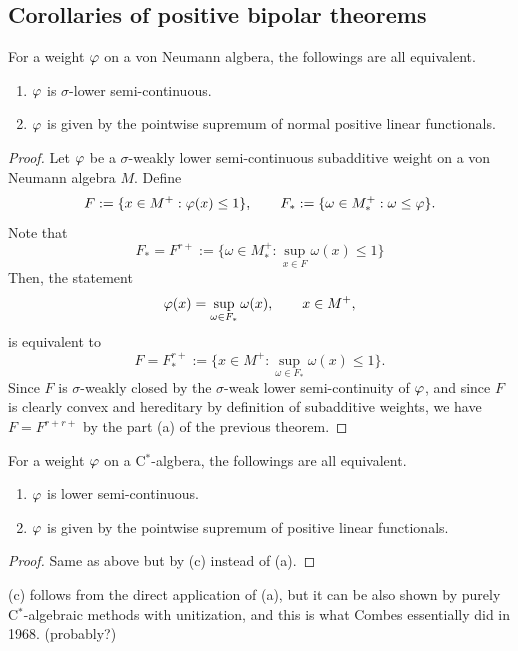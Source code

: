 \documentclass{../../../../small}
\begin{document}
\newpage

\subsection{Corollaries of positive bipolar theorems}

\begin{corollary*}[Haagerup, 1975]
For a weight $\varphi$ on a von Neumann algbera, the followings are all equivalent.
\begin{enumerate}
\item[(3)] $\varphi$ is $\sigma$-lower semi-continuous.
\item[(4)] $\varphi$ is given by the pointwise supremum of normal positive linear functionals.
\end{enumerate}
\end{corollary*}

\begin{proof}
Let $\varphi$ be a $\sigma$-weakly lower semi-continuous subadditive weight on a von Neumann algebra $M$.
Define
\[F:=\{x\in M^+:\varphi(x)\le1\},\qquad F_*:=\{\omega\in M_*^+:\omega\le\varphi\}.\]
Note that
\[F_*=F^{r+}:=\{\omega\in M_*^+:\sup_{x\in F}\omega(x)\le1\}\]
Then, the statement
\[\varphi(x)=\sup_{\omega\in F_*}\omega(x),\qquad x\in M^+,\]
is equivalent to
\[F=F_*^{r+}:=\{x\in M^+:\sup_{\omega\in F_*}\omega(x)\le1\}.\]
Since $F$ is $\sigma$-weakly closed by the $\sigma$-weak lower semi-continuity of $\varphi$, and since $F$ is clearly convex and hereditary by definition of subadditive weights, we have $F=F^{r+r+}$ by the part (a) of the previous theorem.
\end{proof}



\begin{corollary*}[Combes, 1968]
For a weight $\varphi$ on a C$^*$-algbera, the followings are all equivalent.
\begin{enumerate}
\item[(3)] $\varphi$ is lower semi-continuous.
\item[(4)] $\varphi$ is given by the pointwise supremum of positive linear functionals.
\end{enumerate}
\end{corollary*}
\begin{proof}
Same as above but by (c) instead of (a).
\end{proof}


\begin{remark*}
(c) follows from the direct application of (a), but it can be also shown by purely C$^*$-algebraic methods with unitization, and this is what Combes essentially did in 1968. (probably?)
\end{remark*}
\end{document}
